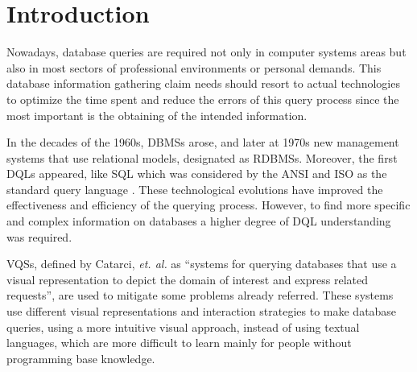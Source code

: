 \newcommand{\novathesis}{\emph{novathesis}}
\newcommand{\novathesisclass}{\texttt{novathesis.cls}}


\chapter{Introduction}
\label{cha:introduction}
Nowadays, database queries are required not only in computer systems areas but also in most sectors of professional environments or personal demands. This database information gathering claim needs should resort to actual technologies to optimize the time spent and reduce the errors of this query process since the most important is the obtaining of the intended information.

In the decades of the 1960s, \glspl{DBMS} arose, and later at 1970s new management systems that use relational models, designated as \glspl{RDBMS}. Moreover, the first \glspl{DQL} appeared, like \gls{SQL} \cite{sequel_aStructuredEnglishQueryLanguage} which was considered by the \gls{ANSI} and \gls{ISO} as the standard query language \cite{databaseManagementSystems}. These technological evolutions have improved the effectiveness and efficiency of the querying process. However, to find more specific and complex information on databases a higher degree of \gls{DQL} understanding was required. 

\Glspl{VQS}, defined by Catarci, \textit{et. al.} \cite{visualQuerySystemsForDatabases_aSurvey} as “systems for querying databases that use a visual representation to depict the domain of interest and express related requests”, are used to mitigate some problems already referred. These systems use different visual representations and interaction strategies to make database queries, using a more intuitive visual approach, instead of using textual languages, which are more difficult to learn mainly for people without programming base knowledge.


